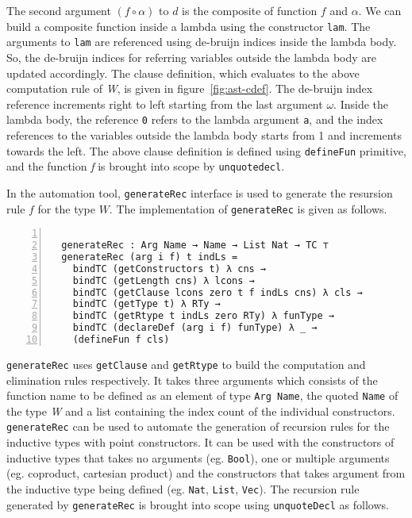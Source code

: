 \documentclass[sigplan,10pt]{acmart}
\begin{document}
\normalsize

The second argument $(f \circ \alpha)$ to $d$ is the composite of function $f$ and $\alpha$. We can build a composite function inside a lambda using the constructor {\tt lam}. The arguments to {\tt lam} are referenced using de-bruijn indices inside the lambda body. So, the de-bruijn indices for referring variables outside the lambda body are updated accordingly. The clause definition, which evaluates to the above computation rule of \emph{W}, is given in figure~\ref{fig:ast-cdef}. The de-bruijn index reference increments right to left starting from the last argument $\omega$. Inside the lambda body, the reference {\tt 0} refers to the lambda argument {\tt a}, and the index references to the variables outside the lambda body starts from 1 and increments towards the left. The above clause definition is defined using {\tt defineFun} primitive, and the function \emph{f} is brought into scope by {\tt unquotedecl}. 

In the automation tool, {\tt generateRec} interface is used to generate the resursion rule $f$ for the type $W$. The implementation of {\tt generateRec} is given as follows.

\begin{center}
\begingroup
\fontsize{7pt}{9pt}\selectfont
\begin{Verbatim}[frame = lines, rulecolor=\color{blue}, numbers = left, numbersep = 0pt]

  generateRec : Arg Name → Name → List Nat → TC ⊤
  generateRec (arg i f) t indLs =
    bindTC (getConstructors t) λ cns →
    bindTC (getLength cns) λ lcons →
    bindTC (getClause lcons zero t f indLs cns) λ cls →
    bindTC (getType t) λ RTy → 
    bindTC (getRtype t indLs zero RTy) λ funType →
    bindTC (declareDef (arg i f) funType) λ _ →
    (defineFun f cls)

\end{Verbatim}
\endgroup
\end{center}

\normalsize

{\tt generateRec} uses {\tt getClause} and {\tt getRtype} to build the computation and elimination rules respectively. It takes three arguments which consists of the function name to be defined as an element of type {\tt Arg Name}, the quoted {\tt Name} of the type \emph{W} and a list containing the index count of the individual constructors. {\tt generateRec} can be used to automate the generation of recursion rules for the inductive types with point constructors. It can be used with the constructors of inductive types that takes no arguments (eg. {\tt Bool}), one or multiple arguments (eg. coproduct, cartesian product) and the constructors that takes argument from the inductive type being defined (eg. {\tt Nat}, {\tt List}, {\tt Vec}). The recursion rule generated by {\tt generateRec} is brought into scope using {\tt unquoteDecl} as follows.
\end{document}
